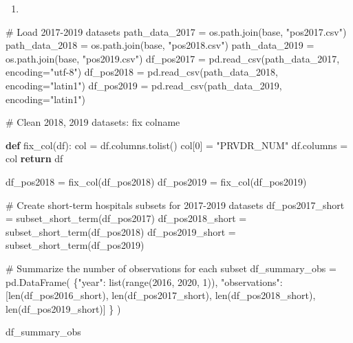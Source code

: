 \documentclass[
  letterpaper,
  DIV=11,
  numbers=noendperiod]{scrartcl}
\newenvironment{Shaded}{\begin{snugshade}}{\end{snugshade}}
\newcommand{\BuiltInTok}[1]{\textcolor[rgb]{0.00,0.23,0.31}{#1}}
\newcommand{\CommentTok}[1]{\textcolor[rgb]{0.37,0.37,0.37}{#1}}
\newcommand{\ControlFlowTok}[1]{\textcolor[rgb]{0.00,0.23,0.31}{\textbf{#1}}}
\newcommand{\DecValTok}[1]{\textcolor[rgb]{0.68,0.00,0.00}{#1}}
\newcommand{\KeywordTok}[1]{\textcolor[rgb]{0.00,0.23,0.31}{\textbf{#1}}}
\newcommand{\NormalTok}[1]{\textcolor[rgb]{0.00,0.23,0.31}{#1}}
\newcommand{\OperatorTok}[1]{\textcolor[rgb]{0.37,0.37,0.37}{#1}}
\newcommand{\StringTok}[1]{\textcolor[rgb]{0.13,0.47,0.30}{#1}}
\providecommand{\tightlist}{%
  \setlength{\itemsep}{0pt}\setlength{\parskip}{0pt}}\usepackage{longtable,booktabs,array}
\begin{document}
\begin{enumerate}
\def\labelenumi{\arabic{enumi}.}
\setcounter{enumi}{2}
\tightlist
\item
\end{enumerate}

\begin{Shaded}
\begin{Highlighting}[]
\CommentTok{\# Load 2017{-}2019 datasets}
\NormalTok{path\_data\_2017 }\OperatorTok{=}\NormalTok{ os.path.join(base, }\StringTok{"pos2017.csv"}\NormalTok{)}
\NormalTok{path\_data\_2018 }\OperatorTok{=}\NormalTok{ os.path.join(base, }\StringTok{"pos2018.csv"}\NormalTok{)}
\NormalTok{path\_data\_2019 }\OperatorTok{=}\NormalTok{ os.path.join(base, }\StringTok{"pos2019.csv"}\NormalTok{)}
\NormalTok{df\_pos2017 }\OperatorTok{=}\NormalTok{ pd.read\_csv(path\_data\_2017, encoding}\OperatorTok{=}\StringTok{"utf{-}8"}\NormalTok{)}
\NormalTok{df\_pos2018 }\OperatorTok{=}\NormalTok{ pd.read\_csv(path\_data\_2018, encoding}\OperatorTok{=}\StringTok{"latin1"}\NormalTok{)}
\NormalTok{df\_pos2019 }\OperatorTok{=}\NormalTok{ pd.read\_csv(path\_data\_2019, encoding}\OperatorTok{=}\StringTok{"latin1"}\NormalTok{)}

\CommentTok{\# Clean 2018, 2019 datasets: fix colname}


\KeywordTok{def}\NormalTok{ fix\_col(df):}
\NormalTok{    col }\OperatorTok{=}\NormalTok{ df.columns.tolist()}
\NormalTok{    col[}\DecValTok{0}\NormalTok{] }\OperatorTok{=} \StringTok{"PRVDR\_NUM"}
\NormalTok{    df.columns }\OperatorTok{=}\NormalTok{ col}
    \ControlFlowTok{return}\NormalTok{ df}


\NormalTok{df\_pos2018 }\OperatorTok{=}\NormalTok{ fix\_col(df\_pos2018)}
\NormalTok{df\_pos2019 }\OperatorTok{=}\NormalTok{ fix\_col(df\_pos2019)}

\CommentTok{\# Create short{-}term hospitals subsets for 2017{-}2019 datasets}
\NormalTok{df\_pos2017\_short }\OperatorTok{=}\NormalTok{ subset\_short\_term(df\_pos2017)}
\NormalTok{df\_pos2018\_short }\OperatorTok{=}\NormalTok{ subset\_short\_term(df\_pos2018)}
\NormalTok{df\_pos2019\_short }\OperatorTok{=}\NormalTok{ subset\_short\_term(df\_pos2019)}


\CommentTok{\# Summarize the number of observations for each subset}
\NormalTok{df\_summary\_obs }\OperatorTok{=}\NormalTok{ pd.DataFrame(}
\NormalTok{    \{}\StringTok{"year"}\NormalTok{: }\BuiltInTok{list}\NormalTok{(}\BuiltInTok{range}\NormalTok{(}\DecValTok{2016}\NormalTok{, }\DecValTok{2020}\NormalTok{, }\DecValTok{1}\NormalTok{)),}
     \StringTok{"observations"}\NormalTok{: [}\BuiltInTok{len}\NormalTok{(df\_pos2016\_short), }\BuiltInTok{len}\NormalTok{(df\_pos2017\_short), }\BuiltInTok{len}\NormalTok{(df\_pos2018\_short), }\BuiltInTok{len}\NormalTok{(df\_pos2019\_short)]}
\NormalTok{     \}}
\NormalTok{)}

\NormalTok{df\_summary\_obs}
\end{Highlighting}
\end{Shaded}
\end{document}
